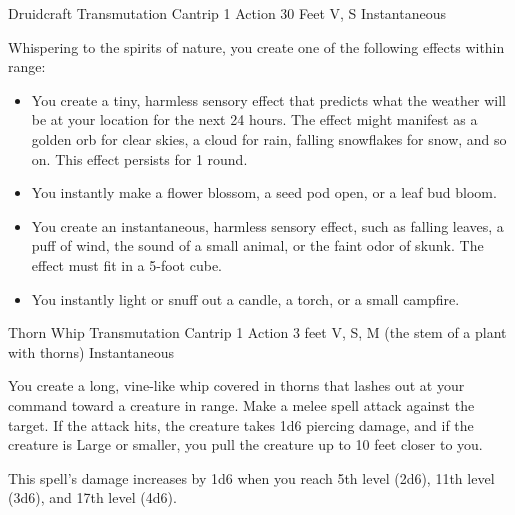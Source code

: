 \documentclass[a4paper,openany,twocolumn]{book}
\begin{document}
\DndSpellHeader
{Druidcraft}
{Transmutation Cantrip}
{1 Action}
{30 Feet}
{V, S}
{Instantaneous}

Whispering to the spirits of nature, you create one of the
following effects within range:


\begin{itemize}
  \item You create a tiny, harmless sensory effect that predicts what the
weather will be at your location for the next 24 hours. The effect might
manifest as a golden orb for clear skies, a cloud for rain, falling snowflakes
for snow, and so on. This effect persists for 1 round.
  \item You instantly make a flower blossom, a seed pod open, or a leaf bud
bloom.
  \item You create an instantaneous, harmless sensory effect, such as falling
leaves, a puff of wind, the sound of a small animal, or the faint odor of skunk.
The effect must fit in a 5-foot cube.
  \item You instantly light or snuff out a candle, a torch, or a
small campfire.
\end{itemize}

\DndSpellHeader
{Thorn Whip}
{Transmutation Cantrip}
{1 Action}
{3 feet}
{V, S, M (the stem of a plant with thorns)}
{Instantaneous}

You create a long, vine-like whip covered in thorns that lashes out at your
command toward a creature in range.  Make a melee spell attack against the
target. If the attack hits, the creature takes 1d6 piercing damage, and if the
creature is Large or smaller, you pull the creature up to 10 feet closer to you.

This spell's damage increases by 1d6 when you reach 5th level (2d6), 11th level
(3d6), and 17th level (4d6).
\end{document}

